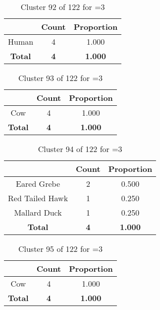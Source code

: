 \begin{table}[ht!]
\centering
\begin{tabular}{|c|c|c|}
\hline
\bf \Spec{} &\bf Count &\bf Proportion\\ \hline \hline
Human & 4 & 1.000\\ \hline
\hline
\bf Total & \bf 4 & \bf 1.000\\ \hline
\end{tabular}
\label{tab:cluster:92:3}
\caption{Cluster 92 of 122 for \minneigh{}=3}
\end{table}

\begin{table}[ht!]
\centering
\begin{tabular}{|c|c|c|}
\hline
\bf \Spec{} &\bf Count &\bf Proportion\\ \hline \hline
Cow & 4 & 1.000\\ \hline
\hline
\bf Total & \bf 4 & \bf 1.000\\ \hline
\end{tabular}
\label{tab:cluster:93:3}
\caption{Cluster 93 of 122 for \minneigh{}=3}
\end{table}

\begin{table}[ht!]
\centering
\begin{tabular}{|c|c|c|}
\hline
\bf \Spec{} &\bf Count &\bf Proportion\\ \hline \hline
Eared Grebe & 2 & 0.500\\ \hline
Red Tailed Hawk & 1 & 0.250\\ \hline
Mallard Duck & 1 & 0.250\\ \hline
\hline
\bf Total & \bf 4 & \bf 1.000\\ \hline
\end{tabular}
\label{tab:cluster:94:3}
\caption{Cluster 94 of 122 for \minneigh{}=3}
\end{table}

\begin{table}[ht!]
\centering
\begin{tabular}{|c|c|c|}
\hline
\bf \Spec{} &\bf Count &\bf Proportion\\ \hline \hline
Cow & 4 & 1.000\\ \hline
\hline
\bf Total & \bf 4 & \bf 1.000\\ \hline
\end{tabular}
\label{tab:cluster:95:3}
\caption{Cluster 95 of 122 for \minneigh{}=3}
\end{table}

